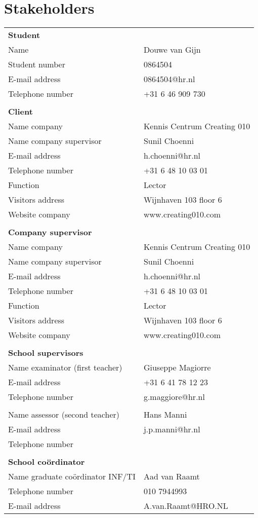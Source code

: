 \section{Stakeholders}
\begin{center}
\begin{tabular} { l l }
    \textbf{Student} & \\
    Name & Douwe van Gijn \\
    Student number & 0864504 \\
    E-mail address & 0864504@hr.nl \\
    Telephone number & +31 6 46 909 730 \\
    & \\
    \textbf{Client} & \\
    Name company & Kennis Centrum Creating 010 \\
    Name company supervisor & Sunil Choenni \\
    E-mail address & h.choenni@hr.nl \\
    Telephone number & +31 6 48 10 03 01  \\
    Function & Lector \\
    Visitors address & Wijnhaven 103 floor 6 \\
    Website company & www.creating010.com \\
    & \\
    \textbf{Company supervisor} & \\
    Name company & Kennis Centrum Creating 010 \\
    Name company supervisor & Sunil Choenni \\
    E-mail address & h.choenni@hr.nl \\
    Telephone number & +31 6 48 10 03 01  \\
    Function & Lector \\
    Visitors address & Wijnhaven 103 floor 6 \\
    Website company & www.creating010.com \\
    & \\
    \textbf{School supervisors} & \\
    Name examinator (first teacher) & Giuseppe Magiorre \\
    E-mail address & +31 6 41 78 12 23 \\
    Telephone number & g.maggiore@hr.nl \\
    & \\
    Name assessor (second teacher) & Hans Manni \\
    E-mail address & j.p.manni@hr.nl \\
    Telephone number & \\
    & \\
    \textbf{School coördinator} & \\
    Name graduate coördinator INF/TI & Aad van Raamt \\
    Telephone number & 010 7944993 \\
    E-mail address & A.van.Raamt@HRO.NL \\
\end{tabular}
\end{center}
\newpage
